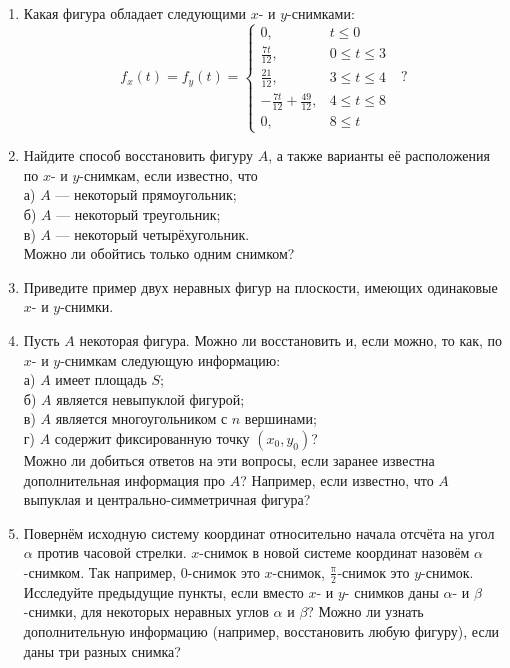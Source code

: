 \begin{enumerate}
\item Какая фигура обладает следующими $x$- и $y$-снимками:
$$f_x(t)= f_y(t)=\begin{cases}
0, &t\leq 0\\
\tfrac{7t}{12}, &0\leq t\leq 3\\
\tfrac{21}{12}, &3\leq t\leq 4\\
-\tfrac{7t}{12}+ \tfrac{49}{12},&4\leq t\leq 8\\
0,& 8\leq t
\end{cases} \,\,\,\,?$$

\item Найдите способ восстановить фигуру $A$, а также варианты её расположения по $x$- и $y$-снимкам, если известно, что \\
а) $A$ --- некоторый прямоугольник;\\
б) $A$ --- некоторый треугольник;\\
в) $A$ --- некоторый четырёхугольник.\\
Можно ли обойтись только одним снимком?

\item Приведите пример двух неравных фигур на плоскости, имеющих одинаковые $x$- и $y$-снимки.
\item Пусть $A$ некоторая фигура. Можно ли восстановить и, если можно, то как, по $x$- и $y$-снимкам следующую информацию:\\
а) $A$ имеет площадь $S$;\\
б) $A$ является невыпуклой фигурой; \\
в) $A$ является многоугольником с $n$ вершинами;\\
г) $A$ содержит фиксированную точку $(x_0,y_0)$?\\
Можно ли добиться ответов на эти вопросы, если заранее известна дополнительная информация про $A$? Например, если известно, что $A$ выпуклая и центрально-симметричная фигура?
\item Повернём исходную систему координат относительно начала отсчёта на угол $\alpha$ против часовой стрелки. $x$-снимок в новой  системе координат назовём $\alpha$-снимком. Так например, $0$-снимок это $x$-снимок, $\frac{\text{π}}{2}$-снимок это $y$-снимок.
Исследуйте предыдущие пункты, если вместо $x$- и $y$- снимков даны $\alpha$- и $\beta$-снимки, для некоторых неравных углов $\alpha$ и $\beta$? Можно ли узнать дополнительную информацию (например, восстановить любую фигуру), если даны три разных снимка?
\end{enumerate}


